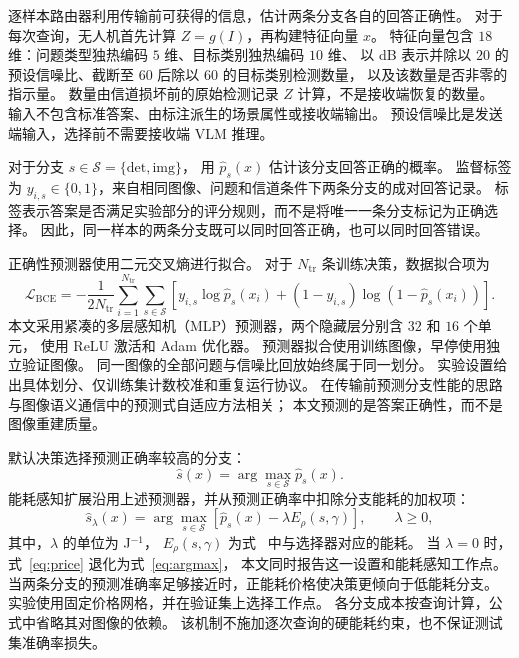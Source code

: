 逐样本路由器利用传输前可获得的信息，估计两条分支各自的回答正确性。
对于每次查询，无人机首先计算 $Z=g(I)$，再构建特征向量 $x$。
特征向量包含 $18$ 维：问题类型独热编码 $5$ 维、目标类别独热编码 $10$ 维、
以 dB 表示并除以 $20$ 的预设信噪比、截断至 $60$ 后除以 $60$ 的目标类别检测数量，
以及该数量是否非零的指示量。
数量由信道损坏前的原始检测记录 $Z$ 计算，不是接收端恢复的数量。
输入不包含标准答案、由标注派生的场景属性或接收端输出。
预设信噪比是发送端输入，选择前不需要接收端 VLM 推理。

对于分支 $s\in\mathcal S=\{\mathrm{det},\mathrm{img}\}$，
用 $\widehat p_s(x)$ 估计该分支回答正确的概率。
监督标签为 $y_{i,s}\in\{0,1\}$，来自相同图像、问题和信道条件下两条分支的成对回答记录。
标签表示答案是否满足实验部分的评分规则，而不是将唯一一条分支标记为正确选择。
因此，同一样本的两条分支既可以同时回答正确，也可以同时回答错误。

正确性预测器使用二元交叉熵进行拟合。
对于 $N_{\mathrm{tr}}$ 条训练决策，数据拟合项为
\begin{equation}
\mathcal L_{\mathrm{BCE}}
=-\frac{1}{2N_{\mathrm{tr}}}
\sum_{i=1}^{N_{\mathrm{tr}}}\sum_{s\in\mathcal S}
\left[y_{i,s}\log\widehat p_s(x_i)
+(1-y_{i,s})\log(1-\widehat p_s(x_i))\right].
\label{eq:loss}
\end{equation}
本文采用紧凑的多层感知机（MLP）预测器，两个隐藏层分别含 $32$ 和 $16$ 个单元，
使用 ReLU 激活和 Adam 优化器。
预测器拟合使用训练图像，早停使用独立验证图像。
同一图像的全部问题与信噪比回放始终属于同一划分。
实验设置给出具体划分、仅训练集计数校准和重复运行协议。
在传输前预测分支性能的思路与图像语义通信中的预测式自适应方法相关\cite{zhang2023padc}；
本文预测的是答案正确性，而不是图像重建质量。

默认决策选择预测正确率较高的分支：
\begin{equation}
\widehat s(x)=\arg\max_{s\in\mathcal S}\widehat p_s(x).
\label{eq:argmax}
\end{equation}
能耗感知扩展沿用上述预测器，并从预测正确率中扣除分支能耗的加权项：
\begin{equation}
\widehat s_\lambda(x)=
\arg\max_{s\in\mathcal S}
\left[\widehat p_s(x)-\lambda E_\rho(s,\gamma)\right],
\qquad \lambda\ge0,
\label{eq:price}
\end{equation}
其中，$\lambda$ 的单位为 J$^{-1}$，
$E_\rho(s,\gamma)$ 为式~ 中与选择器对应的能耗。
当 $\lambda=0$ 时，式~\eqref{eq:price} 退化为式~\eqref{eq:argmax}，
本文同时报告这一设置和能耗感知工作点。
当两条分支的预测准确率足够接近时，正能耗价格使决策更倾向于低能耗分支。
实验使用固定价格网格，并在验证集上选择工作点。
各分支成本按查询计算，公式中省略其对图像的依赖。
该机制不施加逐次查询的硬能耗约束，也不保证测试集准确率损失。

